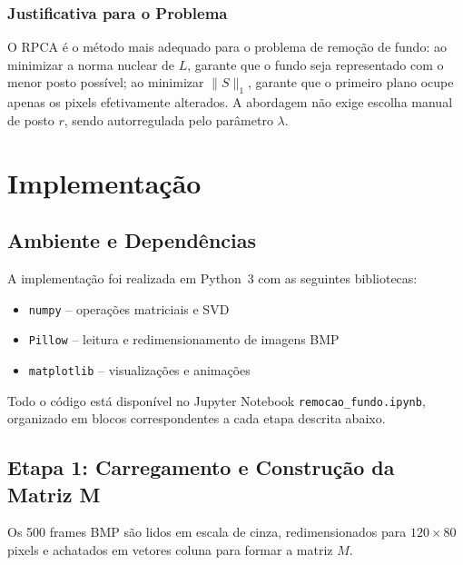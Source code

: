 \documentclass[12pt, a4paper]{article}
\begin{document}
\subsubsection{Justificativa para o Problema}

O RPCA é o método mais adequado para o problema de remoção de fundo: ao minimizar
a norma nuclear de $L$, garante que o fundo seja representado com o menor posto
possível; ao minimizar $\|S\|_1$, garante que o primeiro plano ocupe apenas os
pixels efetivamente alterados. A abordagem não exige escolha manual de posto $r$,
sendo autorregulada pelo parâmetro $\lambda$.

\newpage

\section{Implementação}
\label{sec:implementacao}

\subsection{Ambiente e Dependências}

A implementação foi realizada em Python~3 com as seguintes bibliotecas:

\begin{itemize}
  \item \texttt{numpy} – operações matriciais e SVD
  \item \texttt{Pillow} – leitura e redimensionamento de imagens BMP
  \item \texttt{matplotlib} – visualizações e animações
\end{itemize}

Todo o código está disponível no Jupyter Notebook \texttt{remocao\_fundo.ipynb},
organizado em blocos correspondentes a cada etapa descrita abaixo.


\subsection{Etapa 1: Carregamento e Construção da Matriz M}

Os 500 frames BMP são lidos em escala de cinza, redimensionados para
$120 \times 80$ pixels e achatados em vetores coluna para formar a matriz $M$.
\end{document}
